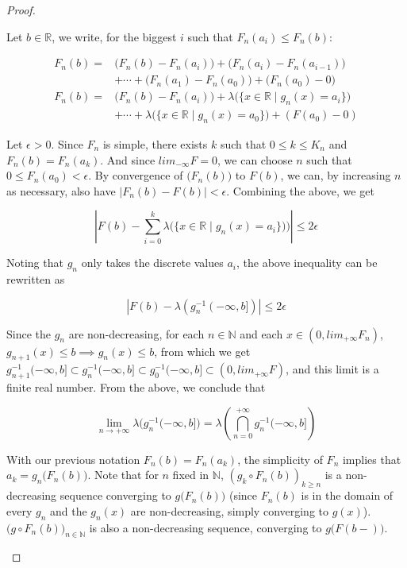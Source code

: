\documentclass[11pt,a4paper,twoside]{article}
\begin{document}
\begin{proof}
\begin{enumerate}
    Let $b \in \mathbb{R}$, we write, for the biggest $i$ such that
    $F_n (a_i) \leq F_n (b)$:

    \begin{align*}
      F_n (b) = & \big( F_n (b) - F_n (a_i) \big) + \big( F_n (a_i) - F_n
      (a_{i - 1}) \big)\\
      & + \cdots + \big( F_n (a_1) - F_n (a_0) \big) + \big( F_n (a_0) - 0 \big)\\
      F_n (b) = & \big( F_n (b) - F_n (a_i) \big) + \lambda \big( \{ x
      \in \mathbb{R} \mid g_n (x) = a_i \} \big)\\
        & + \cdots + \lambda \big( \{ x \in \mathbb{R} \mid g_n (x) = a_0 \} \big) + ( F
          (a_0) - 0 )
    \end{align*}

    Let $\epsilon > 0$. Since $F_n$ is simple, there exists $k$ such
    that $0 \leq k \leq K_n$ and $F_n (b) = F_n (a_k)$. And since
    $lim_{-\infty} F = 0$, we can choose $n$ such that $0 \leq F_n
    (a_0) < \epsilon$. By convergence of $\big( F_n (b) \big)$ to $F
    (b)$, we can, by increasing $n$ as necessary, also have $\big| F_n
    (b) - F (b) \big| < \epsilon$. Combining the above, we get

    \[
    \left| F (b) - \sum_{i = 0}^k \lambda \big( \{ x \in \mathbb{R}
    \mid g_n (x) = a_i \} ) \big) \right| \leq 2\epsilon
    \]

    Noting that $g_n$ only takes the discrete values $a_i$, the above
    inequality can be rewritten as

    \[
    \left| F (b) - \lambda \left( g_n^{-1} \left( -\infty, b \right.]
    \right) \right| \leq 2\epsilon
    \]

    Since the $g_n$ are non-decreasing, for each $n \in \mathbb{N}$
    and each $x \in (0, lim_{+\infty} F_n)$, $g_{n+1} (x) \leq b
    \implies g_n (x) \leq b$, from which we get $g_{n+1}^{-1}
    (-\infty, b] \subset g_n^{-1} (-\infty, b] \subset g_0^{-1}
    (-\infty, b] \subset (0, lim_{+\infty} F)$, and this limit is a
    finite real number. From the above, we conclude that

    \[
    \underset{n \to +\infty}{\lim} \lambda \big( g_n^{-1} (-\infty, b] \big) =
      \lambda \left( \bigcap_{n = 0}^{+\infty} g_n^{-1} (-\infty, b] \right)
    \]

    With our previous notation $F_n (b) = F_n (a_k)$, the simplicity
    of $F_n$ implies that $a_k = g_n \big( F_n (b) \big)$. Note that
    for $n$ fixed in $\mathbb{N}$, $\left( g_k \circ F_n (b)
    \right)_{k \geq n}$ is a non-decreasing sequence converging to $g
    \big( F_n (b) \big)$ (since $F_n (b)$ is in the domain of every
    $g_n$ and the $g_n (x)$ are non-decreasing, simply converging to
    $g (x)$). $\big( g \circ F_n (b) \big)_{n \in \mathbb{N}}$ is also
    a non-decreasing sequence, converging to $g \big( F (b-) \big)$.


\end{enumerate}
\end{proof}
\end{document}

